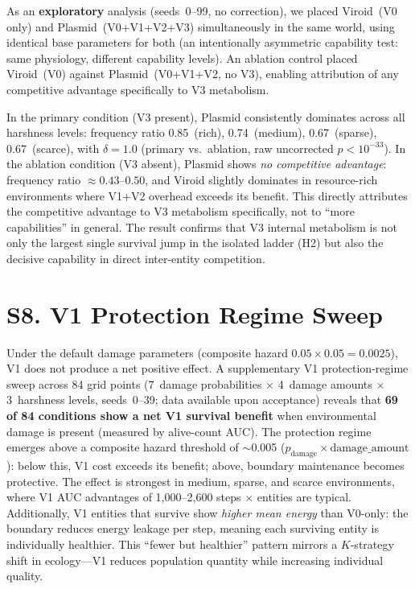 \documentclass[letterpaper]{article}
\begin{document}
As an \textbf{exploratory} analysis (seeds~0--99, no correction), we placed
Viroid~(V0 only) and Plasmid~(V0+V1+V2+V3) simultaneously in the same world,
using identical base parameters for both (an intentionally asymmetric capability
test: same physiology, different capability levels).
An ablation control placed Viroid~(V0) against Plasmid~(V0+V1+V2, no V3),
enabling attribution of any competitive advantage specifically to V3 metabolism.

In the primary condition (V3 present), Plasmid consistently dominates across
all harshness levels: frequency ratio 0.85~(rich), 0.74~(medium), 0.67~(sparse),
0.67~(scarce), with $\delta\!=\!1.0$ (primary vs.\ ablation, raw uncorrected
$p < 10^{-33}$).
In the ablation condition (V3 absent), Plasmid shows \emph{no competitive
advantage}: frequency ratio $\approx 0.43$--$0.50$, and Viroid slightly
dominates in resource-rich environments where V1+V2 overhead exceeds its benefit.
This directly attributes the competitive advantage to V3 metabolism specifically,
not to ``more capabilities'' in general.
The result confirms that V3 internal metabolism is not only the largest single
survival jump in the isolated ladder (H2) but also the decisive capability in
direct inter-entity competition.

\section*{S8. V1 Protection Regime Sweep}
\label{sec:s8}

Under the default damage parameters (composite hazard
$0.05 \times 0.05 = 0.0025$), V1 does not produce a net positive effect.
A supplementary V1 protection-regime sweep across 84 grid points
(7~damage probabilities $\times$ 4~damage amounts $\times$ 3~harshness levels,
seeds~0--39; data available upon acceptance)
reveals that \textbf{69 of 84 conditions show a net V1 survival
benefit} when environmental damage is present (measured by alive-count AUC).
The protection regime emerges above a composite hazard threshold of
$\sim$0.005 ($p_\text{damage} \times \text{damage\_amount}$): below this,
V1 cost exceeds its benefit; above, boundary maintenance becomes
protective.
The effect is strongest in medium, sparse, and scarce environments, where
V1 AUC advantages of 1{,}000--2{,}600 steps $\times$ entities are typical.
Additionally, V1 entities that survive show \emph{higher mean energy}
than V0-only: the boundary reduces energy leakage per step, meaning
each surviving entity is individually healthier.
This ``fewer but healthier'' pattern mirrors a $K$-strategy shift in
ecology---V1 reduces population quantity while increasing individual quality.

\end{document}
